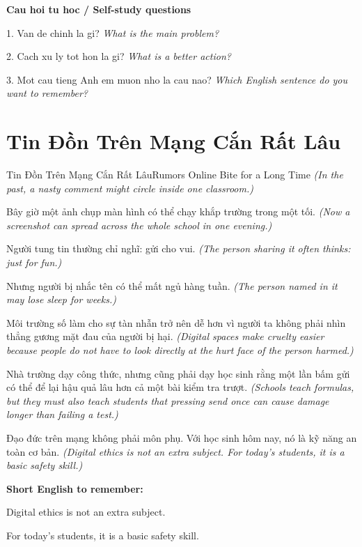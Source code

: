 \begin{tuhocnhanh}
\textbf{Cau hoi tu hoc / Self-study questions}

1. Van de chinh la gi? \textit{What is the main problem?}

2. Cach xu ly tot hon la gi? \textit{What is a better action?}

3. Mot cau tieng Anh em muon nho la cau nao? \textit{Which English sentence do you want to remember?}
\end{tuhocnhanh}
\ngancach

\section{Tin Đồn Trên Mạng Cắn Rất Lâu}
\begin{truyen}{Tin Đồn Trên Mạng Cắn Rất Lâu}{Rumors Online Bite for a Long Time}
\textit{(In the past, a nasty comment might circle inside one classroom.)}

Bây giờ một ảnh chụp màn hình có thể chạy khắp trường trong một tối.
\textit{(Now a screenshot can spread across the whole school in one evening.)}

Người tung tin thường chỉ nghĩ: gửi cho vui.
\textit{(The person sharing it often thinks: just for fun.)}

Nhưng người bị nhắc tên có thể mất ngủ hàng tuần.
\textit{(The person named in it may lose sleep for weeks.)}

Môi trường số làm cho sự tàn nhẫn trở nên dễ hơn vì người ta không phải nhìn thẳng gương mặt đau của người bị hại.
\textit{(Digital spaces make cruelty easier because people do not have to look directly at the hurt face of the person harmed.)}

Nhà trường dạy công thức, nhưng cũng phải dạy học sinh rằng một lần bấm gửi có thể để lại hậu quả lâu hơn cả một bài kiểm tra trượt.
\textit{(Schools teach formulas, but they must also teach students that pressing send once can cause damage longer than failing a test.)}

\end{truyen}

\begin{baihoc}
Đạo đức trên mạng không phải môn phụ. Với học sinh hôm nay, nó là kỹ năng an toàn cơ bản.
\textit{(Digital ethics is not an extra subject. For today’s students, it is a basic safety skill.)}
\end{baihoc}

\begin{ghinhoanh}
\textbf{Short English to remember:}

Digital ethics is not an extra subject.

For today’s students, it is a basic safety skill.

\end{ghinhoanh}

